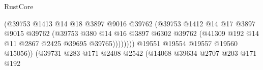 \begin{lexlean}{RustCore}
\begin{coremodule}
                                                    (@39753
                                                      @1413
                                                      @14
                                                      @18
                                                      @3897
                                                      @9016
                                                      @39762
                                                      (@39753
                                                        @1412
                                                        @14
                                                        @17
                                                        @3897
                                                        @9015
                                                        @39762
                                                        (@39753
                                                          @380
                                                          @14
                                                          @16
                                                          @3897
                                                          @6302
                                                          @39762
                                                          (@41309
                                                            @192
                                                            @14
                                                            @11
                                                            @2867
                                                            @2425
                                                            @39695
                                                            @39765))))))))
                                            @19551
                                            @19554
                                            @19557
                                            @19560
                                            @15056))
                                        (@39731
                                          @283
                                          @171
                                          @2408
                                          @2542
                                          (@14068
                                            @39634
                                            @2707
                                            @203
                                            @171
                                            @192

\end{coremodule}
\end{lexlean}
